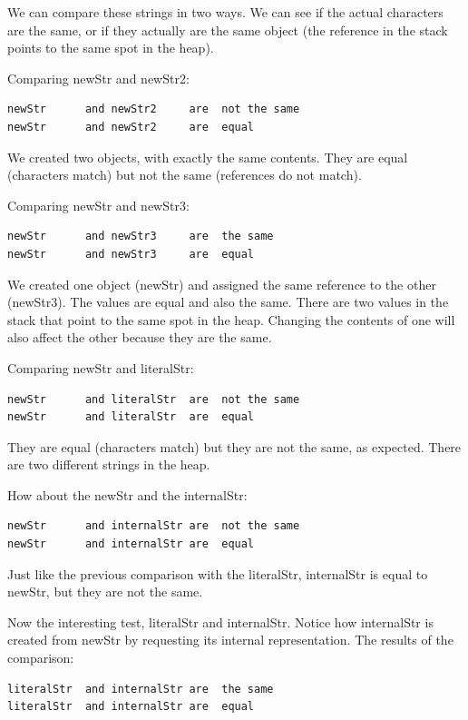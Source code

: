 We can compare these strings in two ways. We can see if the actual characters are the same, or if they actually are the same object (the reference in the stack points to the same spot in the heap).

Comparing newStr and newStr2:
\begin{lstlisting}[language=Java]
newStr      and newStr2     are  not the same
newStr      and newStr2     are  equal
\end{lstlisting}

We created two objects, with exactly the same contents. They are equal (characters match) but not the same (references do not match).

Comparing newStr and newStr3:
\begin{lstlisting}[language=Java]
newStr      and newStr3     are  the same
newStr      and newStr3     are  equal
\end{lstlisting}

We created one object (newStr) and assigned the same reference to the other (newStr3). The values are equal and also the same. There are two values in the stack that point to the same spot in the heap. Changing the contents of one will also affect the other because they are the same.

Comparing newStr and literalStr:
\begin{lstlisting}[language=Java]
newStr      and literalStr  are  not the same
newStr      and literalStr  are  equal
\end{lstlisting}

They are equal (characters match) but they are not the same, as expected. There are two different strings in the heap.

How about the newStr and the internalStr:
\begin{lstlisting}[language=Java]
newStr      and internalStr are  not the same
newStr      and internalStr are  equal
\end{lstlisting}

Just like the previous comparison with the literalStr, internalStr is equal to newStr, but they are not the same.

Now the interesting test, literalStr and internalStr. Notice how internalStr is created from newStr by requesting its internal representation. The results of the comparison:
\begin{lstlisting}[language=Java]
literalStr  and internalStr are  the same
literalStr  and internalStr are  equal
\end{lstlisting}

